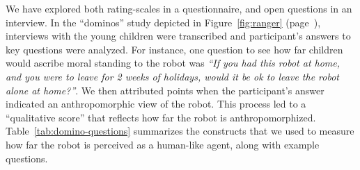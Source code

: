 \documentclass{frontiersSCNS} %
\begin{document}
We have explored both rating-scales in a questionnaire, and open questions in an
interview.  In the ``dominos'' study depicted in Figure~\ref{fig:ranger}
(page~\pageref{fig:ranger}), interviews with the young children were transcribed
and participant's answers to key questions were analyzed. For instance, one
question to see how far children would ascribe moral standing to the robot was
\emph{``If you had this robot at home, and you were to leave for 2 weeks of
holidays, would it be ok to leave the robot alone at home?''}. We then
attributed points when the participant's answer indicated an anthropomorphic
view of the robot. This process led to a ``qualitative score'' that reflects how
far the robot is anthropomorphized. Table~\ref{tab:domino-questions} summarizes
the constructs that we used to measure how far the robot is perceived as a
human-like agent, along with example questions.
\end{document}
